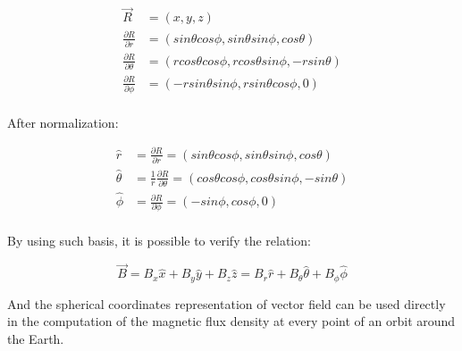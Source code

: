 \begin{align*}
	\vec{R} &= (x,y,z) \\
	\frac{\partial R}{\partial r} &= (sin\theta cos\phi,sin\theta sin\phi,cos\theta) \\
	\frac{\partial R}{\partial \theta} &= (rcos\theta cos\phi, rcos\theta sin\phi, -rsin\theta) \\
	\frac{\partial R}{\partial \phi} &= (-rsin\theta sin\phi, rsin\theta cos\phi, 0) \\
\end{align*}

\indent
After normalization:

\begin{align*}
	\hat{r} &= \frac{\partial R}{\partial r} = (sin\theta cos\phi,sin\theta sin\phi,cos\theta) \\
	\hat{\theta} &= \frac{1}{r}\frac{\partial R}{\partial \theta}  = (cos\theta cos\phi, cos\theta sin\phi, -sin\theta) \\
	\hat{\phi} &= \frac{\partial R}{\partial \phi} = (-sin\phi, cos\phi, 0) \\
\end{align*}

\indent 
By using such basis, it is possible to verify the relation: 

\begin{equation}
	\vec{B} = B_{x}\hat{x} + B_{y}\hat{y} + B_{z}\hat{z} = B_{r}\hat{r} + B_{\theta}\hat{\theta} + B_{\phi}\hat{\phi}
\end{equation}

\indent
And the spherical coordinates representation of vector field can be used directly in the computation of the magnetic flux density at every point of an orbit around the Earth.

